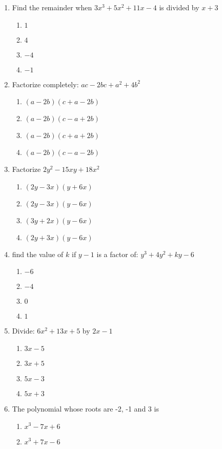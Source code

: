 \begin{multicols}{2}
\begin{enumerate}[label={\arabic*.}]
\item Find the remainder when $3x^3 + 5x^2 + 11x -4$ is divided by $x+3$
	\begin{enumerate}[label={\Alph*.}]
	\item \(1\)
	\item \(4\)
	\item \(-4\)
	\item \(-1\)
	\end{enumerate}
\item Factorize completely: $ac -2bc + a^2 + 4b^2$ 
	\begin{enumerate}[label={\Alph*.}]
	\item \((a-2b)(c+a-2b)\)
	\item \((a-2b)(c-a+2b)\)
	\item \((a-2b)(c+a+2b)\)
	\item \((a-2b)(c-a-2b)\)
	\end{enumerate}
\item Factorize $2y^2 - 15xy + 18x^2$
	\begin{enumerate}[label={\Alph*.}]
	\item \((2y - 3x)(y + 6x)\)
	\item \((2y -3x)(y-6x)\)
	\item \((3y + 2x )(y -6x)\)
	\item \((2y + 3x)(y-6x)\)
	\end{enumerate}
\item find the value of $k$ if $y-1$ is a factor of: $y^3 + 4y^2 + ky - 6$ 
	\begin{enumerate}[label={\Alph*.}]
	\item \(-6\)
	\item \(-4\)
	\item \(0\)
	\item \(1\)
	\end{enumerate}
\item Divide: $6x^2 + 13x + 5$ by $2x -1$ 
	\begin{enumerate}[label={\Alph*.}]
	\item \(3x -5\)
	\item \(3x + 5\)
	\item \(5x -3\)
	\item \(5x + 3\)
	\end{enumerate}
\item The polynomial whose roots are -2, -1 and 3 is
	\begin{enumerate}[label={\Alph*.}]
	\item \(x^3 - 7x + 6\)
	\item \(x^3 + 7x -6\)

\end{enumerate}
\end{enumerate}
\end{multicols}
